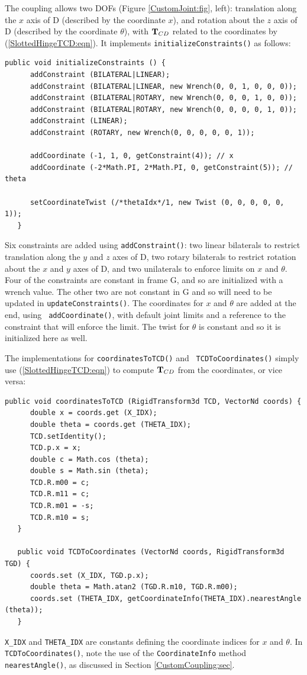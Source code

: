 The coupling allows two DOFs (Figure \ref{CustomJoint:fig}, left):
translation along the $x$ axis of D (described by the coordinate $x$),
and rotation about the $z$ axis of D (described by the coordinate
$\theta$), with ${\bf T}_{CD}$ related to the coordinates by
(\ref{SlottedHingeTCD:eqn}). It implements
{\tt initializeConstraints()} as follows:
%
\begin{lstlisting}[]
   public void initializeConstraints () {
      addConstraint (BILATERAL|LINEAR);
      addConstraint (BILATERAL|LINEAR, new Wrench(0, 0, 1, 0, 0, 0));
      addConstraint (BILATERAL|ROTARY, new Wrench(0, 0, 0, 1, 0, 0));
      addConstraint (BILATERAL|ROTARY, new Wrench(0, 0, 0, 0, 1, 0));
      addConstraint (LINEAR);
      addConstraint (ROTARY, new Wrench(0, 0, 0, 0, 0, 1));
   
      addCoordinate (-1, 1, 0, getConstraint(4)); // x
      addCoordinate (-2*Math.PI, 2*Math.PI, 0, getConstraint(5)); // theta

      setCoordinateTwist (/*thetaIdx*/1, new Twist (0, 0, 0, 0, 0, 1));
   }
\end{lstlisting}
%
Six constraints are added using {\tt addConstraint()}: two linear bilaterals to
restrict translation along the $y$ and $z$ axes of D, two rotary bilaterals to
restrict rotation about the $x$ and $y$ axes of D, and two unilaterals to
enforce limits on $x$ and $\theta$. Four of the constraints are constant in
frame G, and so are initialized with a wrench value. The other two are not
constant in G and so will need to be updated in {\tt updateConstraints()}. The
coordinates for $x$ and $\theta$ are added at the end, using {\tt
addCoordinate()}, with default joint limits and a reference to the constraint
that will enforce the limit. The twist for $\theta$ is constant and so it is
initialized here as well.

The implementations for {\tt coordinatesToTCD()} and {\tt
TCDToCoordinates()} simply use (\ref{SlottedHingeTCD:eqn}) to
compute ${\bf T}_{CD}$ from the coordinates, or vice versa:
%
\begin{lstlisting}[]
   public void coordinatesToTCD (RigidTransform3d TCD, VectorNd coords) {
      double x = coords.get (X_IDX);
      double theta = coords.get (THETA_IDX);
      TCD.setIdentity();
      TCD.p.x = x;
      double c = Math.cos (theta);
      double s = Math.sin (theta);
      TCD.R.m00 = c;
      TCD.R.m11 = c;
      TCD.R.m01 = -s;
      TCD.R.m10 = s;
   }
   
   public void TCDToCoordinates (VectorNd coords, RigidTransform3d TGD) {
      coords.set (X_IDX, TGD.p.x);
      double theta = Math.atan2 (TGD.R.m10, TGD.R.m00);
      coords.set (THETA_IDX, getCoordinateInfo(THETA_IDX).nearestAngle (theta));
   }
\end{lstlisting}
%
{\tt X\_IDX} and {\tt THETA\_IDX} are constants defining the
coordinate indices for $x$ and $\theta$. In {\tt TCDToCoordinates()},
note the use of the {\tt CoordinateInfo} method {\tt
nearestAngle()}, as discussed in Section
\ref{CustomCoupling:sec}.

